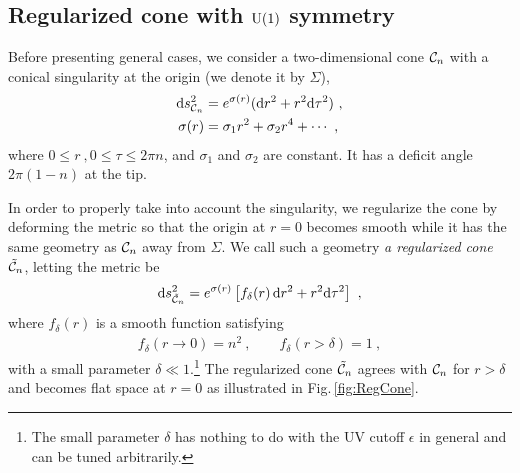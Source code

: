 \subsection{Regularized cone with $\mathrm{U}(1)$ symmetry}\label{ss:RegConeU(1)}
Before presenting general cases, we consider a two-dimensional cone ${\cal C}_n$ with a conical singularity at the origin (we denote it by $\Sigma$),
\begin{align}
\begin{aligned}
\mathrm{d} s^2_{{\cal C}_n} &= e^{\sigma (r)} (\mathrm{d} r^2 + r^2 \mathrm{d}\tau^2) \ , \\
\sigma(r) &= \sigma_1 r^2 + \sigma_2 r^4 + \cdots \ ,
\end{aligned}
\end{align}
where $0\le r \ ,  0\le \tau \le 2\pi n$, and $\sigma_1$ and $\sigma_2$ are constant.
It has a deficit angle $2\pi(1-n)$ at the tip. 


In order to properly take into account the singularity, we regularize the cone by deforming the metric so that the origin at $r=0$ becomes smooth while it has the same geometry as ${\cal C}_n$ away from $\Sigma$.
We call such a geometry \emph{a regularized cone} $\tilde {{\cal C}}_n$, letting the metric be 
\begin{align}\label{RegCone}
\mathrm{d} s^2_{\tilde {{\cal C}}_n} = e^{\sigma (r)} \left[ f_\delta (r)\, \mathrm{d} r^2 + r^2 \mathrm{d} \tau^2 \right] \ ,
\end{align}
where $f_\delta (r)$ is a smooth function satisfying
\begin{align}\label{SmoothingFunction}
f_\delta (r \to 0) = n^2 \ , \qquad f_\delta (r>\delta) = 1 \ ,
\end{align}
with a small parameter $\delta \ll 1$.\footnote{The small parameter $\delta$ has nothing to do with the UV cutoff $\epsilon$ in general and can be tuned arbitrarily.}
The regularized cone $\tilde{{\cal C}}_n$ agrees with ${\cal C}_n$ for $r> \delta$ and becomes flat space at $r=0$ as illustrated in Fig.\,\ref{fig:RegCone}.

